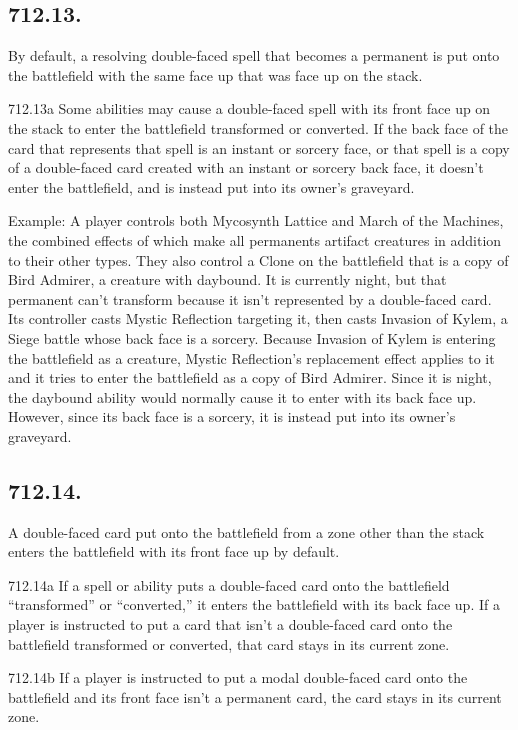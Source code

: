 \subsection*{712.13.}
By default, a resolving double-faced spell that becomes a permanent is put onto the battlefield with the same face up that was face up on the stack.

712.13a Some abilities may cause a double-faced spell with its front face up on the stack to enter the battlefield transformed or converted. If the back face of the card that represents that spell is an instant or sorcery face, or that spell is a copy of a double-faced card created with an instant or sorcery back face, it doesn’t enter the battlefield, and is instead put into its owner’s graveyard.

Example: A player controls both Mycosynth Lattice and March of the Machines, the combined effects of which make all permanents artifact creatures in addition to their other types. They also control a Clone on the battlefield that is a copy of Bird Admirer, a creature with daybound. It is currently night, but that permanent can’t transform because it isn’t represented by a double-faced card. Its controller casts Mystic Reflection targeting it, then casts Invasion of Kylem, a Siege battle whose back face is a sorcery. Because Invasion of Kylem is entering the battlefield as a creature, Mystic Reflection’s replacement effect applies to it and it tries to enter the battlefield as a copy of Bird Admirer. Since it is night, the daybound ability would normally cause it to enter with its back face up. However, since its back face is a sorcery, it is instead put into its owner’s graveyard.

\subsection*{712.14.}
A double-faced card put onto the battlefield from a zone other than the stack enters the battlefield with its front face up by default.

712.14a If a spell or ability puts a double-faced card onto the battlefield “transformed” or “converted,” it enters the battlefield with its back face up. If a player is instructed to put a card that isn’t a double-faced card onto the battlefield transformed or converted, that card stays in its current zone.

712.14b If a player is instructed to put a modal double-faced card onto the battlefield and its front face isn’t a permanent card, the card stays in its current zone.


